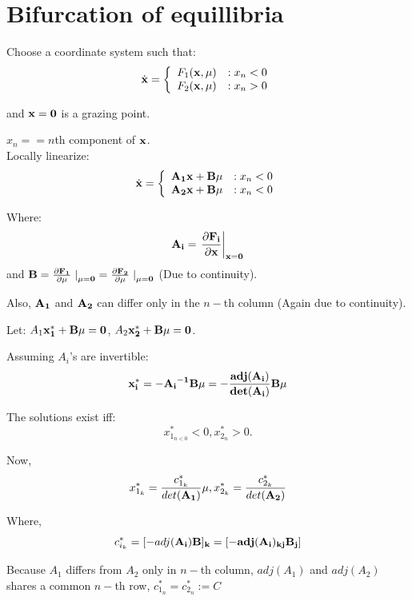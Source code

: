 \documentclass[xcolor=x11names,compress]{beamer}
\renewcommand{\(}{\begin{columns}}
\renewcommand{\)}{\end{columns}}
\newcommand{\<}[1]{\begin{column}{#1}}
\renewcommand{\>}{\end{column}}
\begin{document}
\section{Bifurcation of equillibria}

\begin{frame}
Choose a coordinate system such that:\\
\begin{displaymath}
   \dot{\bf{x}} = \left\{
     \begin{array}{lr}
       F_1(\bf{x},\mu) & : x_n<0\\
       F_2(\bf{x},\mu) & : x_n>0
     \end{array}
   \right.
\end{displaymath}

and $\bf{x}=0$ is a grazing point.  

$x_n==n$th component of $\bf{x}$.  \\

Locally linearize:
\begin{displaymath}
   \dot{\bf{x}} = \left\{
     \begin{array}{lr}
       \bf{A_1x+\bf{B}\mu} & : x_n<0\\
       \bf{A_2x+\bf{B}\mu} & : x_n<0\\
     \end{array}
   \right.
\end{displaymath}

Where:\\
\[
\bf{A_i}=\left.\frac{\partial F_i}{\partial \bf{x}}\right|_{x=0}
\]
and 
$\bf{B}=\frac{\partial F_1}{\partial \mu}\left.\right|_{\mu=0}=\frac{\partial F_2}{\partial \mu}\left.\right|_{\mu=0}$
 (Due to continuity).

Also, $\bf{A_1}$ and $\bf{A_2}$ can differ only in the $n-$th column (Again due to continuity).


\end{frame}


\begin{frame}
Let:
$A_1\bf{x}^*_1+\bf{B}\mu=0$,
$A_2\bf{x}^*_2+\bf{B}\mu=0$.  


Assuming $A_i$'s are invertible:
\[
\bf{x}^*_i=-\bf{A_i}^{-1}\bf{B}\mu=-\frac{adj(\bf{A_i})}{det(\bf{A_i})}\bf{B}\mu
\]

The solutions exist iff:
\[
x^*_{1_{n<0}}<0, x^*_{2{_n}}>0. 
\]  

Now, 
\[
x^*_{1_k}=\frac{c^*_{1_k}}{det(\bf{A_1})}\mu, x^*_{2_k}=\frac{c^*_{2_k}}{det(\bf{A_2})}
\]

Where, \[
c^*_{i_k}=[-adj(\bf{A_i)B}]_k=[-adj(\bf{A_i)_{kj}B_j}]
\]

Because $A_1$ differs from $A_2$ only in $n-$th column, $adj(A_1)$ and  
$adj(A_2)$ shares a common $n-$th row,  $c^*_{1_n}=c^*_{2_n}:=C$

\end{frame}
\end{document}
